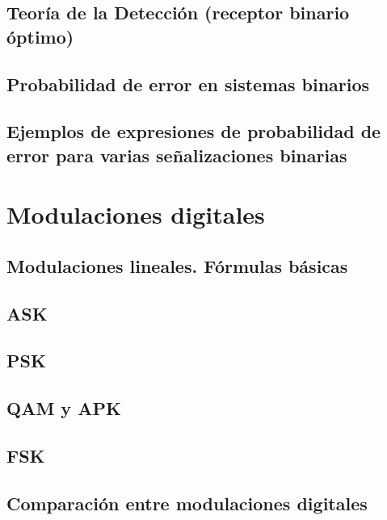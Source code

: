 \documentclass[a4paper]{book}
\begin{document}
\section{Teoría de la Detección (receptor binario óptimo)}
\section{Probabilidad de error en sistemas binarios}
\section[\texorpdfstring{Ejemplos de expresiones de probabilidad de error para varias\\ señalizaciones binarias}{Ejemplos de expresiones de probabilidad de error para varias señalizaciones binarias}]{Ejemplos de expresiones de probabilidad de error para varias señalizaciones binarias}

\chapter{Modulaciones digitales}
\section{Modulaciones lineales. Fórmulas básicas}
\section{ASK}
\section{PSK}
\section{QAM y APK}
\section{FSK}
\section{Comparación entre modulaciones digitales}


%
\end{document}
